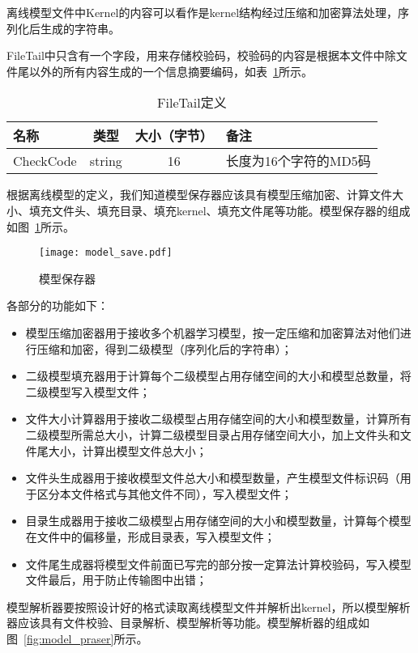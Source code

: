 离线模型文件中Kernel的内容可以看作是kernel结构经过压缩和加密算法处理，序列化后生成的字符串。

FileTail中只含有一个字段，用来存储校验码，校验码的内容是根据本文件中除文件尾以外的所有内容生成的一个信息摘要编码，如表~\ref{tab:file-tail}所示。

\begin{table}[htb]
  \centering\small
  \caption{FileTail定义}
  \label{tab:file-tail}
  \begin{tabular}{lccl}
    \toprule
    名称      & 类型     & 大小（字节）   & 备注       \\
    \midrule
    CheckCode & string  & 16   & 长度为16个字符的MD5码  \\
    \bottomrule
  \end{tabular}
\end{table}

根据离线模型的定义，我们知道模型保存器应该具有模型压缩加密、计算文件大小、填充文件头、填充目录、填充kernel、填充文件尾等功能。模型保存器的组成如图~\ref{fig:mode-save}所示。

\begin{figure}[htb]
  \centering
  \texttt{[image: model\_save.pdf]}
  \caption{模型保存器}
  \label{fig:mode-save}
\end{figure}

各部分的功能如下：
\begin{itemize}
  \item 模型压缩加密器用于接收多个机器学习模型，按一定压缩和加密算法对他们进行压缩和加密，得到二级模型（序列化后的字符串）；
  \item 二级模型填充器用于计算每个二级模型占用存储空间的大小和模型总数量，将二级模型写入模型文件；
  \item 文件大小计算器用于接收二级模型占用存储空间的大小和模型数量，计算所有二级模型所需总大小，计算二级模型目录占用存储空间大小，加上文件头和文件尾大小，计算出模型文件总大小；
  \item 文件头生成器用于接收模型文件总大小和模型数量，产生模型文件标识码（用于区分本文件格式与其他文件不同），写入模型文件；
  \item 目录生成器用于接收二级模型占用存储空间的大小和模型数量，计算每个模型在文件中的偏移量，形成目录表，写入模型文件；
  \item 文件尾生成器将模型文件前面已写完的部分按一定算法计算校验码，写入模型文件最后，用于防止传输图中出错；
\end{itemize}

模型解析器要按照设计好的格式读取离线模型文件并解析出kernel，所以模型解析器应该具有文件校验、目录解析、模型解析等功能。模型解析器的组成如图~\ref{fig:model_praser}所示。

